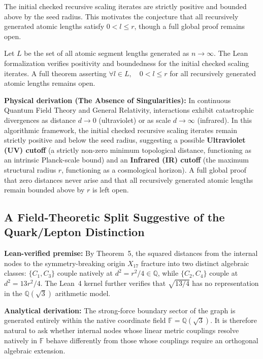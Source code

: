\documentclass[12pt, a4paper]{article}
\begin{document}
The initial checked recursive scaling iterates are strictly positive and bounded above by the seed radius. This motivates the conjecture that all recursively generated atomic lengths satisfy $0 < l \le r$, though a full global proof remains open.

Let $L$ be the set of all atomic segment lengths generated as $n \to \infty$. The Lean formalization verifies positivity and boundedness for the initial checked scaling iterates. A full theorem asserting $\forall l \in L, \quad 0 < l \le r$ for all recursively generated atomic lengths remains open.

\noindent\textbf{Physical derivation (The Absence of Singularities):} In continuous Quantum Field Theory and General Relativity, interactions exhibit catastrophic divergences as distance $d \to 0$ (ultraviolet) or as scale $d \to \infty$ (infrared). In this algorithmic framework, the initial checked recursive scaling iterates remain strictly positive and below the seed radius, suggesting a possible \textbf{Ultraviolet (UV) cutoff} (a strictly non-zero minimum topological distance, functioning as an intrinsic Planck-scale bound) and an \textbf{Infrared (IR) cutoff} (the maximum structural radius $r$, functioning as a cosmological horizon). A full global proof that zero distances never arise and that all recursively generated atomic lengths remain bounded above by $r$ is left open.

\subsection{A Field-Theoretic Split Suggestive of the Quark/Lepton Distinction}

\noindent\textbf{Lean-verified premise:} By Theorem~5, the squared distances from the internal nodes to the symmetry-breaking origin $X_{17}$ fracture into two distinct algebraic classes: $\{C_1, C_3\}$ couple natively at $d^2 = r^2/4 \in \mathbb{Q}$, while $\{C_2, C_4\}$ couple at $d^2 = 13r^2/4$. The Lean~4 kernel further verifies that $\sqrt{13/4}$ has no representation in the $\mathbb{Q}(\sqrt{3})$ arithmetic model.

\medskip

\noindent\textbf{Analytical derivation:} The strong-force boundary sector of the graph is generated entirely within the native coordinate field $\mathbb{F} = \mathbb{Q}(\sqrt{3})$. It is therefore natural to ask whether internal nodes whose linear metric couplings resolve natively in $\mathbb{F}$ behave differently from those whose couplings require an orthogonal algebraic extension.
\end{document}

